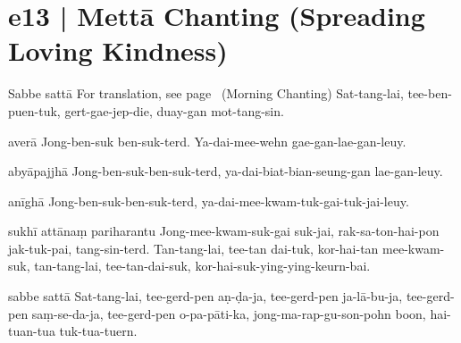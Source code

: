 
\section*{e13 | Mettā Chanting (Spreading Loving Kindness)}\label{sec:e13}

\begin{chantsubsection}
  \chantlineinline
    {Sabbe sattā}
    {For translation, see page~\pageref{sec:m13} (Morning Chanting)}
  \chantindent
    {Sat-tang-lai, tee-ben-puen-tuk, gert-gae-jep-die, duay-gan mot-tang-sin.}
  \chantgap

  \chantonlyinline
    {averā}
  \chantindent
    {Jong-ben-suk ben-suk-terd. Ya-dai-mee-wehn gae-gan-lae-gan-leuy.}
  \chantgap

  \chantonlyinline
    {abyāpajjhā}
  \chantindent
    {Jong-ben-suk-ben-suk-terd, ya-dai-biat-bian-seung-gan lae-gan-leuy.}
  \chantgap

  \chantonlyinline
    {anīghā}
  \chantindent
    {Jong-ben-suk-ben-suk-terd, ya-dai-mee-kwam-tuk-gai-tuk-jai-leuy.}
  \chantgap

  \chantonlyinline
    {sukhī attānaṃ pariharantu}
  \chantindent
    {Jong-mee-kwam-suk-gai suk-jai, rak-sa-ton-hai-pon jak-tuk-pai, tang-sin-terd.}
  \chantindent
    {Tan-tang-lai, tee-tan dai-tuk, kor-hai-tan mee-kwam-suk, tan-tang-lai, tee-tan-dai-suk, kor-hai-suk-ying-ying-keurn-bai.}
  \chantgap

  \chantonlyinline
    {sabbe sattā}
  \chantindent
    {Sat-tang-lai, tee-gerd-pen aṇ-ḍa-ja, tee-gerd-pen ja-lā-bu-ja, tee-gerd-pen saṃ-se-da-ja, tee-gerd-pen o-pa-pāti-ka, jong-ma-rap-gu-son-pohn boon, hai-tuan-tua tuk-tua-tuern.}
\end{chantsubsection}

